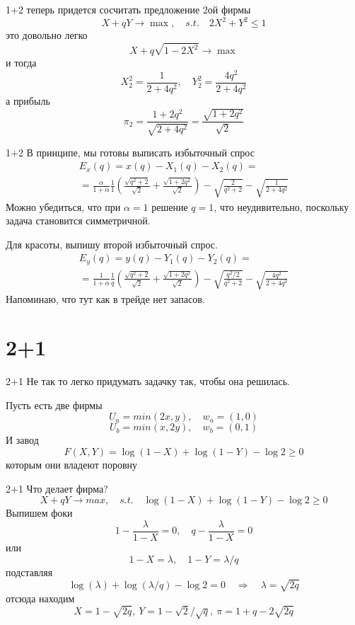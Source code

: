 \documentclass{beamer}
\begin{document}
\begin{frame}{1+2}
теперь придется сосчитать предложение 2ой фирмы
$$ X + q Y \to \max, \quad s.t. \quad 2 X^2 + Y^2 \leqslant 1$$
это довольно легко
$$ X + q \sqrt{1-2 X^2} \to \max$$
и тогда
$$ X^2_2 = \frac{1}{2 + 4 q^2}, \quad Y^2_2 = \frac{4q^2}{2 + 4 q^2}$$
а прибыль
$$ \pi_2 = \frac{1 + 2 q^2}{\sqrt{2 + 4q^2}} = \frac{\sqrt{1+2q^2}}{\sqrt{2}}$$
\end{frame}

\begin{frame}{1+2}
В принципе, мы готовы выписать избыточный спрос
\begin{gather*} E_x(q) = x(q) - X_1(q) - X_2(q) = \\ = \frac{\alpha}{1+\alpha} \frac{1}{1}(\frac{\sqrt{q^2 + 2}}{\sqrt{2}} + \frac{\sqrt{1+2q^2}}{\sqrt{2}}) - \sqrt{\frac{2}{q^2 + 2}} - \sqrt{\frac{1}{2 + 4 q^2}}\end{gather*}
Можно убедиться, что при $\alpha = 1$ решение $q = 1$, что неудивительно, поскольку задача становится симметричной.

Для красоты, выпишу второй избыточный спрос.
\begin{gather*} E_y(q) = y(q) - Y_1(q) - Y_2(q) = \\ = \frac{1}{1+\alpha} \frac{1}{q}(\frac{\sqrt{q^2 + 2}}{\sqrt{2}} + \frac{\sqrt{1+2q^2}}{\sqrt{2}}) - \sqrt{\frac{q^2/2}{q^2 + 2}} - \sqrt{\frac{4q^2}{2 + 4 q^2}}\end{gather*}
Напоминаю, что тут как в трейде нет запасов.
\end{frame}

\section{2+1}

\begin{frame}{2+1}
Не так то легко придумать задачку так, чтобы она решилась.

Пусть есть две фирмы
$$U_a = min(2x, y), \quad w_a = (1,0)$$
$$U_b = min(x, 2y), \quad w_b = (0,1)$$
И завод
$$ F(X,Y) = \log(1-X) + \log(1-Y) - \log 2 \geqslant 0$$
которым они владеют поровну
\end{frame}

\begin{frame}{2+1}
Что делает фирма?
$$X + q Y \to max, \quad s.t. \quad \log(1-X) + \log(1-Y) - \log 2 \geqslant 0$$
Выпишем фоки
$$ 1 - \frac{\lambda}{1-X} = 0, \quad q - \frac{\lambda}{1-X} = 0$$
или
$$ 1 - X = \lambda, \quad 1-Y = \lambda / q$$
подставляя
$$ \log(\lambda) + \log (\lambda/q) - \log 2 = 0 \quad \Rightarrow \quad \lambda = \sqrt{2q}$$
отсюда находим
$$ X = 1 - \sqrt{2q}, \ Y = 1 - \sqrt{2}/\sqrt{q}, \ \pi = 1 + q - 2\sqrt{2q}$$
\end{frame}
\end{document}
